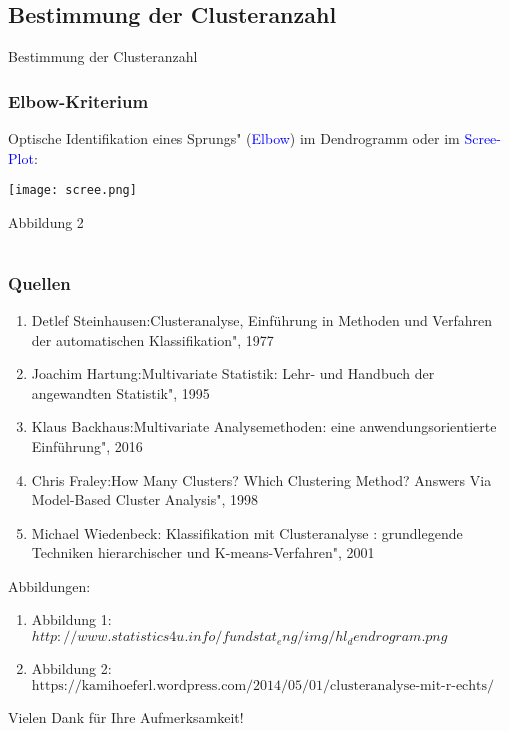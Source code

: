\documentclass{beamer}
\begin{document}
\subsection{Bestimmung der Clusteranzahl}

\begin{frame}
 \centerline{Bestimmung der Clusteranzahl}
\end{frame}

\begin{frame}
 \frametitle{Elbow-Kriterium}
   
 Optische Identifikation eines \glqq Sprungs" (\textcolor{blue}{Elbow}) im Dendrogramm oder im \textcolor{blue}{Scree-Plot}:
 \centerline{{\texttt{[image: scree.png]}}}
 \centerline{Abbildung 2}
\end{frame}

\section*{}

\begin{frame}
 \frametitle{Quellen}
 \begin{enumerate}
  \item Detlef Steinhausen:\glqq Clusteranalyse, Einführung in Methoden und Verfahren der automatischen Klassifikation", 1977
  \item Joachim Hartung:\glqq Multivariate Statistik: Lehr- und Handbuch der angewandten Statistik", 1995
  \item Klaus Backhaus:\glqq Multivariate Analysemethoden: eine anwendungsorientierte Einführung", 2016
  \item Chris Fraley:\glqq How Many Clusters? Which Clustering Method? Answers Via Model-Based Cluster Analysis", 1998
  \item Michael Wiedenbeck: \glqq Klassifikation mit Clusteranalyse : grundlegende Techniken hierarchischer und K-means-Verfahren", 2001
 \end{enumerate}
 Abbildungen:
 \begin{enumerate}
  \item Abbildung 1: $http://www.statistics4u.info/fundstat_eng/img/hl_dendrogram.png$
  \item Abbildung 2: $\text{https://kamihoeferl.wordpress.com/2014/05/01/clusteranalyse-mit-r-echts/}$
 \end{enumerate}
\end{frame}

\begin{frame}
 \centerline{Vielen Dank für Ihre Aufmerksamkeit!}
\end{frame}
\end{document}
